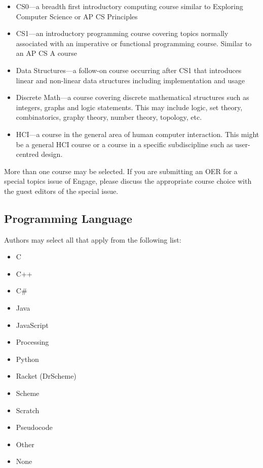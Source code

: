 \documentclass[acmengage]{acmart}
\begin{document}
\begin{itemize}
    \item CS0---a breadth first introductory computing course similar to Exploring Computer Science or AP CS Principles
    \item CS1---an introductory programming course covering topics normally associated with an imperative or functional programming course. Similar to an AP CS A course
    \item Data Structures---a follow-on course occurring after CS1 that introduces linear and non-linear data structures including implementation and usage
    \item Discrete Math---a course covering discrete mathematical
      structures such as integers, graphs and logic statements. This
      may include logic, set theory, combinatorics, graphy theory,
      number theory, topology, etc.
    \item HCI---a course in the general area of human computer
      interaction. This might be a general HCI course or a course in a
      specific subdiscipline such as user-centred design.
\end{itemize}

More than one course may be selected. If you are submitting an OER for a special topics issue of Engage, please discuss the appropriate course choice with the guest editors of the special issue.

\subsection{Programming Language}
Authors may select all that apply from the following list:
\begin{itemize}
    \item C
    \item C++
    \item C\#
    \item Java
    \item JavaScript
    \item Processing
    \item Python
    \item Racket (DrScheme)
    \item Scheme
    \item Scratch
    \item Pseudocode
    \item Other
    \item None
\end{itemize}
\end{document}
